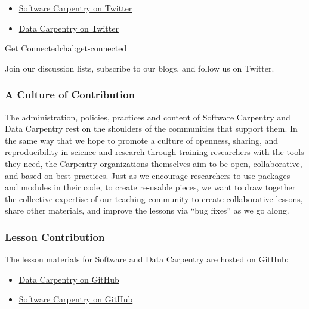 \begin{itemize}
  \begin{itemize}
  \itemsep1pt\parskip0pt
  \item
    \href{https://twitter.com/swcarpentry}{Software Carpentry on
    Twitter}
  \item
    \href{https://twitter.com/datacarpentry}{Data Carpentry on Twitter}
  \end{itemize}
\end{itemize}

\begin{challenge}{Get Connected}{chal:get-connected}

Join our discussion lists, subscribe to our blogs, and follow us on
Twitter.
\end{challenge}

\subsubsection{A Culture of
Contribution}\label{a-culture-of-contribution}

The administration, policies, practices and content of Software
Carpentry and Data Carpentry rest on the shoulders of the communities
that support them. In the same way that we hope to promote a culture of
openness, sharing, and reproducibility in science and research through
training researchers with the tools they need, the Carpentry
organizations themselves aim to be open, collaborative, and based on
best practices. Just as we encourage researchers to use packages and
modules in their code, to create re-usable pieces, we want to draw
together the collective expertise of our teaching community to create
collaborative lessons, share other materials, and improve the lessons
via ``bug fixes'' as we go along.

\subsubsection{Lesson Contribution}\label{lesson-contribution}

The lesson materials for Software and Data Carpentry are hosted on
GitHub:

\begin{itemize}
\itemsep1pt\parskip0pt
\item
  \href{\{\{\%20site.dc\_github\%20\}\}}{Data Carpentry on GitHub}
\item
  \href{\{\{\%20site.swc\_github\%20\}\}}{Software Carpentry on GitHub}
\end{itemize}

